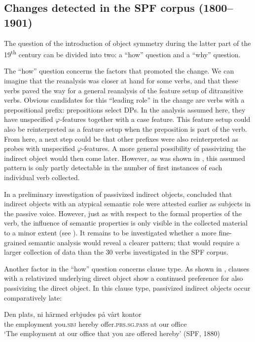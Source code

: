 \documentclass[output=paper]{langscibook}
\begin{document}
\subsection{Changes detected in the SPF corpus (1800–1901)}\label{sec:falk:5.2}


The question of the introduction of object symmetry during the latter part of the 19\textsuperscript{th} century can be divided into two: a “how” question and a “why” question.


The “how” question concerns the factors that promoted the change. We can imagine that the reanalysis was closer at hand for some verbs, and that these verbs paved the way for a general reanalysis of the feature setup of ditransitive verbs. Obvious candidates for this “leading role” in the change are verbs with a prepositional prefix: prepositions select DPs. In the analysis assumed here, they have unspecified $\varphi ${}-features together with a case feature. This feature setup could also be reinterpreted as a feature setup when the preposition is part of the verb. From here, a next step could be that other prefixes were also reinterpreted as probes with unspecified $\varphi ${}-features. A more general possibility of passivizing the indirect object would then come later. However, as was shown in , this assumed pattern is only partly detectable in the number of first instances of each individual verb collected.



In a preliminary investigation of passivized indirect objects, \citet{Falk1995,Falk1997} concluded that indirect objects with an atypical semantic role were attested earlier as subjects in the passive voice. However, just as with respect to the formal properties of the verb, the influence of semantic properties is only visible in the collected material to a minor extent (see ). It remains to be investigated whether a more fine-grained semantic analysis would reveal a clearer pattern; that would require a larger collection of data than the 30 verbs investigated in the SPF corpus.



Another factor in the “how” question concerns clause type. As shown in , clauses with a relativized underlying direct object show a continued preference for also passivizing the direct object. In this clause type, passivized indirect objects occur comparatively late:


\ea%
    \label{ex:falk:24}
\gll Den    plats,        ni        härmed  erbjudes          på  vårt  kontor\\
    the    employment  you.\textsc{sbj}  hereby    offer\textsc{.prs.sg.pass}    at  our  office\\
\glt ‘The employment at our office that you are offered hereby’ (SPF, 1880)
\z
\end{document}

